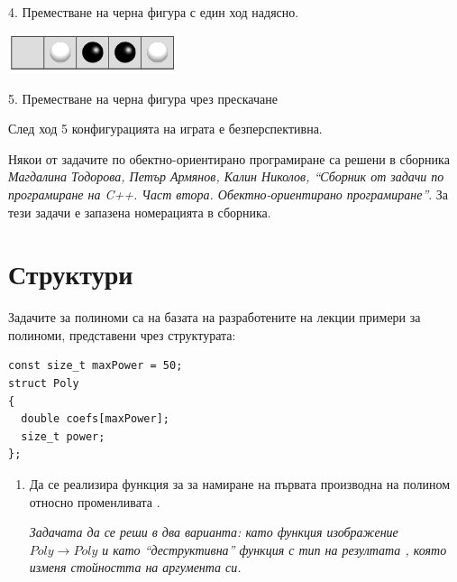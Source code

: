 {\begin{enumerate}[resume]
\begin{mdframed}[hidealllines=true,backgroundcolor=gray!20]
\begin{flushleft}
		4. Преместване на черна фигура с един ход надясно.
		\end{flushleft}

		\begin{flushleft}
		\includegraphics[width=5cm]{images/step4}

		5. Преместване на черна фигура чрез прескачане
		\end{flushleft}

		След ход 5 конфигурацията на играта е безперспективна.

	\end{mdframed}

\end{enumerate}

\pagebreak

\small{Някои от задачите по обектно-ориентирано програмиране са решени в сборника \cite{sbornik2}\textit{Магдалина Тодорова, Петър Армянов, Калин Николов, ``Сборник от задачи по програмиране на C++. Част втора. Обектно-ориентирано програмиране''}. За тези задачи е запазена номерацията в сборника.}

\pagebreak

\clearpage\section{Структури}

\begin{mdframed}[hidealllines=true,backgroundcolor=gray!20]
Задачите за полиноми са на базата на разработените на лекции примери за полиноми, представени чрез структурата:

\begin{verbatim}
const size_t maxPower = 50;
struct Poly
{
  double coefs[maxPower];
  size_t power;
};
\end{verbatim}
\end{mdframed}

\begin{enumerate}


  \item Да се реализира функция  за за намиране на първата производна на полином относно променливата .

  \emph{Задачата да се реши в два варианта: като функция изображение $Poly \rightarrow Poly$ и като ``деструктивна'' функция с тип на резултата , която изменя стойността на аргумента си.}


\end{enumerate}}
